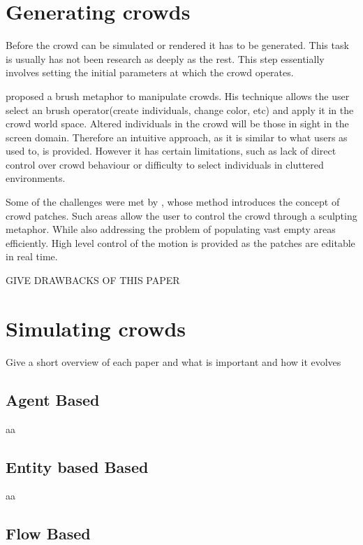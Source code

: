 \documentclass[11pt,twocolumn]{article}
\numberwithin{equation}{section} %
\numberwithin{figure}{section} %
\numberwithin{table}{section} %
\begin{document}
\section{Generating crowds}

Before the crowd can be simulated or rendered it has to be generated.
This task is usually has not been research as deeply as the rest.
This step essentially involves setting the initial parameters at which the crowd operates.

\cite{Ulicny2004} proposed a brush metaphor to manipulate crowds.
His technique allows the user select an brush operator(create individuals, change color, etc) and apply it in the crowd world space.
Altered individuals in the crowd will be those in sight in the screen domain.
Therefore an intuitive approach, as it is similar to what users as used to, is provided.
However it has certain limitations, such as lack of direct control over crowd behaviour or difficulty to select individuals in cluttered environments.

Some of the challenges were met by \cite{Jordao2014}, whose method introduces the concept of crowd patches.
Such areas allow the user to control the crowd through a sculpting metaphor.
While also addressing the problem of populating vast empty areas efficiently.
High level control of the motion is provided as the patches are editable in real time.

GIVE DRAWBACKS OF THIS PAPER

\section{Simulating crowds}

Give a short overview of each paper and what is important and how it evolves

\subsection{Agent Based}

aa

\subsection{Entity based Based}

aa

\subsection{Flow Based}
\end{document}
